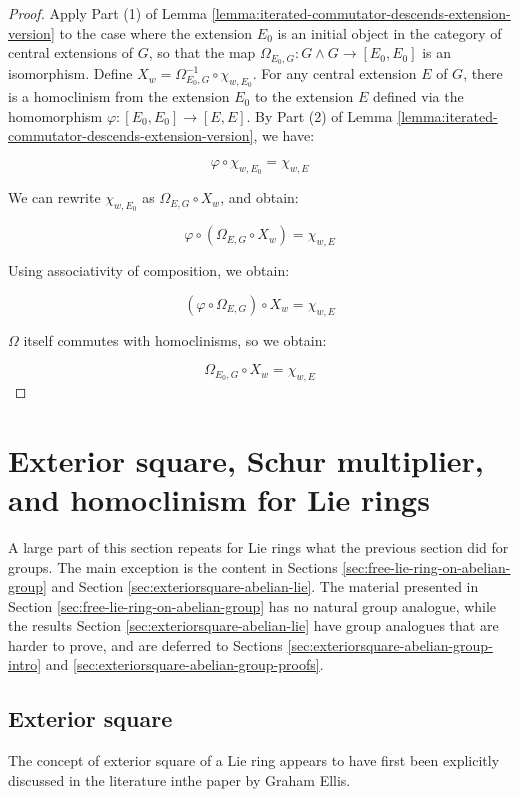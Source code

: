 \documentclass{ucetd}
\begin{document}
\begin{proof}
  Apply Part (1) of Lemma
  \ref{lemma:iterated-commutator-descends-extension-version} to the
  case where the extension $E_0$ is an initial object in the category
  of central extensions of $G$, so that the map $\Omega_{E_0,G}: G
  \wedge G \to [E_0,E_0]$ is an isomorphism. Define $X_w =
  \Omega_{E_0,G}^{-1} \circ \chi_{w,E_0}$. For any central extension
  $E$ of $G$, there is a homoclinism from the extension $E_0$ to the
  extension $E$ defined via the homomorphism $\varphi: [E_0,E_0] \to
  [E,E]$. By Part (2) of Lemma
  \ref{lemma:iterated-commutator-descends-extension-version}, we have:

  $$\varphi \circ \chi_{w,E_0} = \chi_{w,E}$$

  We can rewrite $\chi_{w,E_0}$ as $\Omega_{E,G} \circ X_w$, and obtain:

  $$\varphi \circ (\Omega_{E,G} \circ X_w) = \chi_{w,E}$$

  Using associativity of composition, we obtain:

  $$(\varphi \circ \Omega_{E,G}) \circ X_w = \chi_{w,E}$$

  $\Omega$ itself commutes with homoclinisms, so we obtain:

  $$\Omega_{E_0,G} \circ X_w = \chi_{w,E}$$
\end{proof}
\section{Exterior square, Schur multiplier, and homoclinism for Lie rings}\label{sec:exteriorsquare-and-homoclinism-lie}

A large part of this section repeats for Lie rings what the previous
section did for groups. The main exception is the content in Sections
\ref{sec:free-lie-ring-on-abelian-group} and Section
\ref{sec:exteriorsquare-abelian-lie}. The material presented in
Section \ref{sec:free-lie-ring-on-abelian-group} has no natural group
analogue, while the results Section
\ref{sec:exteriorsquare-abelian-lie} have group analogues that are
harder to prove, and are deferred to Sections
\ref{sec:exteriorsquare-abelian-group-intro} and
\ref{sec:exteriorsquare-abelian-group-proofs}.

\subsection{Exterior square}\label{sec:exteriorsquare-lie}

The concept of exterior square of a Lie ring appears to have first
been explicitly discussed in the literature inthe paper
\cite{EllisLie} by Graham Ellis.
\end{document}
